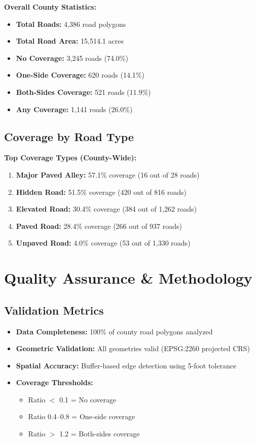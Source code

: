 \documentclass[11pt,letterpaper]{article}
\begin{document}
\textbf{Overall County Statistics:}
\begin{itemize}
    \item \textbf{Total Roads:} 4,386 road polygons
    \item \textbf{Total Road Area:} 15,514.1 acres
    \item \textbf{No Coverage:} 3,245 roads (74.0\%)
    \item \textbf{One-Side Coverage:} 620 roads (14.1\%)
    \item \textbf{Both-Sides Coverage:} 521 roads (11.9\%)
    \item \textbf{Any Coverage:} 1,141 roads (26.0\%)
\end{itemize}

\subsection{Coverage by Road Type}

\textbf{Top Coverage Types (County-Wide):}
\begin{enumerate}
    \item \textbf{Major Paved Alley:} 57.1\% coverage (16 out of 28 roads)
    \item \textbf{Hidden Road:} 51.5\% coverage (420 out of 816 roads)
    \item \textbf{Elevated Road:} 30.4\% coverage (384 out of 1,262 roads)
    \item \textbf{Paved Road:} 28.4\% coverage (266 out of 937 roads)
    \item \textbf{Unpaved Road:} 4.0\% coverage (53 out of 1,330 roads)
\end{enumerate}

\section{Quality Assurance \& Methodology}

\subsection{Validation Metrics}
\begin{itemize}
    \item \textbf{Data Completeness:} 100\% of county road polygons analyzed
    \item \textbf{Geometric Validation:} All geometries valid (EPSG:2260 projected CRS)
    \item \textbf{Spatial Accuracy:} Buffer-based edge detection using 5-foot tolerance
    \item \textbf{Coverage Thresholds:}
    \begin{itemize}
        \item Ratio $<$ 0.1 = No coverage
        \item Ratio 0.4--0.8 = One-side coverage
        \item Ratio $>$ 1.2 = Both-sides coverage
    \end{itemize}
\end{itemize}
\end{document}
